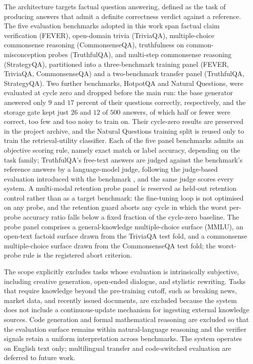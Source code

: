 The architecture targets factual question answering, defined as the task of producing answers that admit a definite correctness verdict against a reference. The five evaluation benchmarks adopted in this work span factual claim verification (FEVER), open-domain trivia (TriviaQA), multiple-choice commonsense reasoning (CommonsenseQA), truthfulness on common-misconception probes (TruthfulQA), and multi-step commonsense reasoning (StrategyQA), partitioned into a three-benchmark training panel (FEVER, TriviaQA, CommonsenseQA) and a two-benchmark transfer panel (TruthfulQA, StrategyQA). Two further benchmarks, HotpotQA \cite{yang-etal-2018-hotpotqa} and Natural Questions, were evaluated at cycle zero and dropped before the main run: the base generator answered only $9$ and $17$ percent of their questions correctly, respectively, and the storage gate kept just $26$ and $12$ of $500$ answers, of which half or fewer were correct, too few and too noisy to train on. Their cycle-zero results are preserved in the project archive, and the Natural Questions training split is reused only to train the retrieval-utility classifier. Each of the five panel benchmarks admits an objective scoring rule, namely exact match or label accuracy, depending on the task family; TruthfulQA's free-text answers are judged against the benchmark's reference answers by a language-model judge, following the judge-based evaluation introduced with the benchmark \cite{lin-etal-2022-truthfulqa}, and the same judge scores every system. A multi-modal retention probe panel is reserved as held-out retention control rather than as a target benchmark: the fine-tuning loop is not optimised on any probe, and the retention guard aborts any cycle in which the worst per-probe accuracy ratio falls below a fixed fraction of the cycle-zero baseline. The probe panel comprises a general-knowledge multiple-choice surface (MMLU), an open-text factoid surface drawn from the TriviaQA test fold, and a commonsense multiple-choice surface drawn from the CommonsenseQA test fold; the worst-probe rule is the registered abort criterion.

The scope explicitly excludes tasks whose evaluation is intrinsically subjective, including creative generation, open-ended dialogue, and stylistic rewriting. Tasks that require knowledge beyond the pre-training cutoff, such as breaking news, market data, and recently issued documents, are excluded because the system does not include a continuous-update mechanism for ingesting external knowledge sources. Code generation and formal mathematical reasoning are excluded so that the evaluation surface remains within natural-language reasoning and the verifier signals retain a uniform interpretation across benchmarks. The system operates on English text only; multilingual transfer and code-switched evaluation are deferred to future work.

